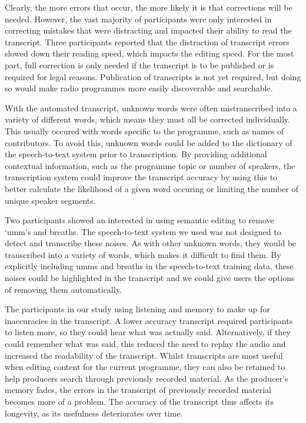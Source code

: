 Clearly, the more errors that occur, the more likely it is that corrections will be needed. However, the vast majority
of participants were only interested in correcting mistakes that were distracting and impacted their ability to read
the transcript. Three participants reported that the distraction of transcript errors slowed down their reading speed,
which impacts the editing speed.
For the most part, full correction is only needed if the transcript is to be
published or is required for legal reasons. Publication of transcripts is not yet required, but doing so would make
radio programmes more easily discoverable and searchable.


With the automated transcript, unknown words were often mistranscribed into a variety of different words, which means
they must all be corrected individually. This usually occured with words specific to the programme, such as names of
contributors. To avoid this, unknown words could be added to the dictionary of the speech-to-text system prior to
transcription. By providing additional contextual information, such as the programme topic or number of speakers, the
transcription system could improve the transcript accuracy by using this to better calculate the likelihood of a given
word occuring or limiting the number of unique speaker segments.

Two participants showed an interested in using semantic editing to remove `umm's and breaths. The speech-to-text
system we used was not designed to detect and transcribe these noises. As with other unknown words, they would be
transcribed into a variety of words, which makes it difficult to find them. By explicitly including umms and breaths in
the speech-to-text training data, these noises could be highlighted in the transcript and we could give users the
options of removing them automatically.

The participants in our study using listening and memory to make up for inaccuracies in the transcript. A lower
accuracy transcript required participants to listen more, so they could hear what was actually said. Alternatively, if
they could remember what was said, this reduced the need to replay the audio and increased the readability of the
transcript.  Whilst transcripts are most useful when editing content for the current programme, they can also be
retained to help producers search through previously recorded material. As the producer's memory fades, the errors in
the transcript of previously recorded material becomes more of a problem. The accuracy of the transcript thus affects
its longevity, as its usefulness deteriorates over time.

